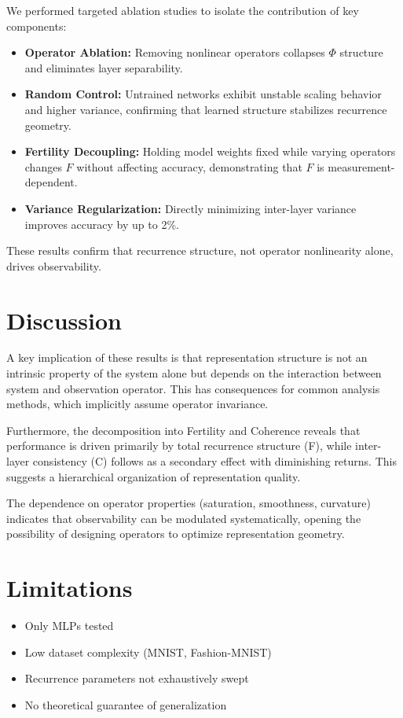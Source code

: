 \documentclass[11pt]{article}
\begin{document}
We performed targeted ablation studies to isolate the contribution of key components:

\begin{itemize}
	\item \textbf{Operator Ablation:} Removing nonlinear operators collapses $\Phi$ structure and eliminates layer separability.
	\item \textbf{Random Control:} Untrained networks exhibit unstable scaling behavior and higher variance, confirming that learned structure stabilizes recurrence geometry.
	\item \textbf{Fertility Decoupling:} Holding model weights fixed while varying operators changes $F$ without affecting accuracy, demonstrating that $F$ is measurement-dependent.
	\item \textbf{Variance Regularization:} Directly minimizing inter-layer variance improves accuracy by up to 2\%.
\end{itemize}

These results confirm that recurrence structure, not operator nonlinearity alone, drives observability.

\section{Discussion}

A key implication of these results is that representation structure is not
an intrinsic property of the system alone but depends on the interaction
between system and observation operator. This has consequences for common
analysis methods, which implicitly assume operator invariance.

Furthermore, the decomposition into Fertility and Coherence reveals that
performance is driven primarily by total recurrence structure (F),
while inter-layer consistency (C) follows as a secondary effect with
diminishing returns. This suggests a hierarchical organization of
representation quality.

The dependence on operator properties (saturation, smoothness, curvature)
indicates that observability can be modulated systematically, opening
the possibility of designing operators to optimize representation geometry.

\section{Limitations}

\begin{itemize}
	\item Only MLPs tested
	\item Low dataset complexity (MNIST, Fashion-MNIST)
	\item Recurrence parameters not exhaustively swept
	\item No theoretical guarantee of generalization
\end{itemize}
\end{document}

